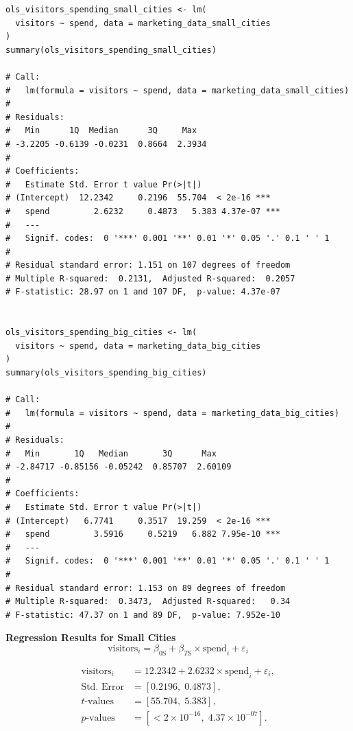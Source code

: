 \documentclass{article}
\begin{document}
\begin{lstlisting}[style=Rstyle, caption=Linear Model for Visitors separeted by City Size]
ols_visitors_spending_small_cities <- lm(
  visitors ~ spend, data = marketing_data_small_cities
)
summary(ols_visitors_spending_small_cities)

# Call:
#   lm(formula = visitors ~ spend, data = marketing_data_small_cities)
# 
# Residuals:
#   Min      1Q  Median      3Q     Max 
# -3.2205 -0.6139 -0.0231  0.8664  2.3934 
# 
# Coefficients:
#   Estimate Std. Error t value Pr(>|t|)    
# (Intercept)  12.2342     0.2196  55.704  < 2e-16 ***
#   spend         2.6232     0.4873   5.383 4.37e-07 ***
#   ---
#   Signif. codes:  0 '***' 0.001 '**' 0.01 '*' 0.05 '.' 0.1 ' ' 1
# 
# Residual standard error: 1.151 on 107 degrees of freedom
# Multiple R-squared:  0.2131,	Adjusted R-squared:  0.2057 
# F-statistic: 28.97 on 1 and 107 DF,  p-value: 4.37e-07


ols_visitors_spending_big_cities <- lm(
  visitors ~ spend, data = marketing_data_big_cities
)
summary(ols_visitors_spending_big_cities)

# Call:
#   lm(formula = visitors ~ spend, data = marketing_data_big_cities)
# 
# Residuals:
#   Min       1Q   Median       3Q      Max 
# -2.84717 -0.85156 -0.05242  0.85707  2.60109 
# 
# Coefficients:
#   Estimate Std. Error t value Pr(>|t|)    
# (Intercept)   6.7741     0.3517  19.259  < 2e-16 ***
#   spend         3.5916     0.5219   6.882 7.95e-10 ***
#   ---
#   Signif. codes:  0 '***' 0.001 '**' 0.01 '*' 0.05 '.' 0.1 ' ' 1
# 
# Residual standard error: 1.153 on 89 degrees of freedom
# Multiple R-squared:  0.3473,	Adjusted R-squared:   0.34 
# F-statistic: 47.37 on 1 and 89 DF,  p-value: 7.952e-10
\end{lstlisting}

\textbf{Regression Results for Small Cities}
$$
\text{visitors}_i = \beta_{0 \text{S}} + \beta_{T \text{S}} \times \text{spend}_i + \varepsilon_i
$$

\[
\begin{aligned}
\text{visitors}_i &= 12.2342 + 2.6232 \times \text{spend}_i + \varepsilon_i, \\
\text{Std. Error} &= [0.2196, \; 0.4873], \\
t\text{-values} &= [55.704, \; 5.383], \\
p\text{-values} &= [<2 \times 10^{-16}, \; 4.37 \times 10^{-07}].
\end{aligned}
\]
\end{document}
